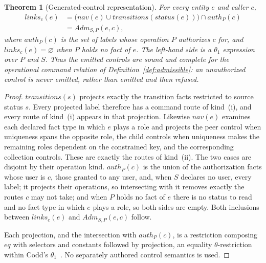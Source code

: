 \documentclass[10pt,twocolumn]{article}
\theoremstyle{plain}
\newtheorem{theorem}{Theorem}
\theoremstyle{definition}
\begin{document}
\begin{theorem}[Generated-control representation]\label{thm:hateoas}
For every entity $e$ and caller $c$,
\begin{align}
\mathit{links}_c(e)&=\bigl(\mathit{nav}(e)\cup\mathit{transitions}(\mathit{status}(e))\bigr)\cap\mathit{auth}_P(c) \label{eq:links}\\
&=\mathit{Adm}_{S,P}(e,c),\nonumber
\end{align}
where $\mathit{auth}_P(c)$ is the set of labels whose operation $P$ authorizes $c$ for, and $\mathit{links}_c(e)=\varnothing$ when $P$ holds no fact of $e$. The left-hand side is a $\theta_1$ expression over $P$ and $S$. Thus the emitted controls are sound and complete for the operational command relation of Definition~\ref{def:admissible}: an unauthorized control is never emitted, rather than emitted and then refused.
\end{theorem}
\begin{proof}
$\mathit{transitions}(s)$ projects exactly the transition facts restricted to source status $s$. Every projected label therefore has a command route of kind~(i), and every route of kind~(i) appears in that projection. Likewise $\mathit{nav}(e)$ examines each declared fact type in which $e$ plays a role and projects the peer control when uniqueness spans the opposite role, the child controls when uniqueness makes the remaining roles dependent on the constrained key, and the corresponding collection controls. These are exactly the routes of kind~(ii). The two cases are disjoint by their operation kind. $\mathit{auth}_P(c)$ is the union of the authorization facts whose user is $c$, those granted to any user, and, when $S$ declares no user, every label; it projects their operations, so intersecting with it removes exactly the routes $c$ may not take; and when $P$ holds no fact of $e$ there is no status to read and no fact type in which $e$ plays a role, so both sides are empty. Both inclusions between $\mathit{links}_c(e)$ and $\mathit{Adm}_{S,P}(e,c)$ follow.

Each projection, and the intersection with $\mathit{auth}_P(c)$, is a restriction composing $\mathit{eq}$ with selectors and constants followed by projection, an equality $\theta$-restriction~\cite[Sec.\,2.3.5]{codd72} within Codd's $\theta_1$~\cite[Sec.\,2.2]{codd70}. No separately authored control semantics is used.
\end{proof}
\end{document}
